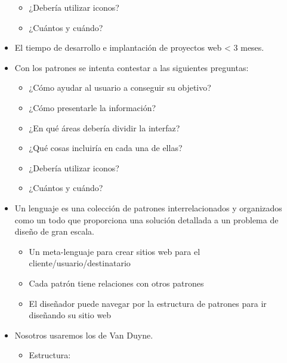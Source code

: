 \documentclass[12pt, twoside, openright]{report} %
\begin{document}
\begin{itemize}
\begin{itemize}
		      \item ¿Debería utilizar iconos?

		      \item ¿Cuántos y cuándo?
	      \end{itemize}
	\item El tiempo de desarrollo e implantación de proyectos web
	      \textless{} 3 meses.
	\item Con los patrones se intenta contestar a las siguientes
	      preguntas:
	      \vspace{-0.5cm}

	      \begin{itemize}
		      \item ¿Cómo ayudar al usuario a conseguir su objetivo?

		      \item ¿Cómo presentarle la información?

		      \item ¿En qué áreas debería dividir la interfaz?

		      \item ¿Qué cosas incluiría en cada una de ellas?

		      \item ¿Debería utilizar iconos?

		      \item ¿Cuántos y cuándo?
	      \end{itemize}
	\item Un lenguaje es una colección de patrones interrelacionados y
	      organizados como un todo que proporciona una solución detallada
	      a un problema de diseño de gran escala.

	      \begin{itemize}
		      \item Un meta-lenguaje para crear sitios web para el
		            cliente/usuario/destinatario

		      \item Cada patrón tiene relaciones con otros patrones

		      \item El diseñador puede navegar por la estructura de patrones para
		            ir diseñando su sitio web
	      \end{itemize}
	\item Nosotros usaremos los de Van Duyne.

	      \begin{itemize}
		      \item Estructura:


\end{itemize}
\end{itemize}
\end{document}
